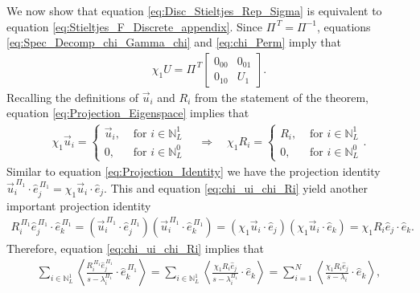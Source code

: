 \documentclass{cmslatex}
\begin{document}
We now show that equation \eqref{eq:Disc_Stieltjes_Rep_Sigma} is
equivalent to equation \eqref{eq:Stieltjes_F_Discrete_appendix}. Since
$\Pi^{\,T}=\Pi^{-1}$, equations \eqref{eq:Spec_Decomp_chi_Gamma_chi} and 
\eqref{eq:chi_Perm} imply that
%
\begin{align}\label{eq:Projection_Eigenspace}
  \chi_1U=\Pi^{\,T}\left[
  \begin{array}{ccc}
    0_{00}&0_{01}\\
    0_{10}&U_1  
    \end{array}
\right].
\end{align}
%
Recalling the definitions of $\vec{u}_i$ and $R_i$ from the
statement of the theorem, equation \eqref{eq:Projection_Eigenspace}
implies that 
%
\begin{align}\label{eq:chi_ui_chi_Ri}
  \chi_1\vec{u}_i=
  \begin{cases}
  \vec{u}_i, &\text{ for } i\in\mathbb{N}_L^1  \\
  0,        &\text{ for } i\in\mathbb{N}_L^0
  \end{cases}
  \quad \Rightarrow \quad
   \chi_1R_i=
  \begin{cases}
  R_i, &\text{ for } i\in\mathbb{N}_L^1  \\
  0,  &\text{ for } i\in\mathbb{N}_L^0
  \end{cases}.
\end{align}
%
Similar to equation \eqref{eq:Projection_Identity} we have the
projection identity
$\vec{u}_i^{\,\Pi_1}\cdot\hat{e}_j^{\,\Pi_1}=\chi_1\vec{u}_i\cdot\hat{e}_j$. This and
equation \eqref{eq:chi_ui_chi_Ri} yield another important projection
identity 
%
\begin{align*}
  R_i^{\,\Pi_1}\hat{e}_j^{\,\Pi_1}\cdot\hat{e}_k^{\,\Pi_1}
  =
   (\vec{u}_i^{\,\Pi_1}\cdot\hat{e}_j^{\,\Pi_1})(\vec{u}_i^{\,\Pi_1}\cdot\hat{e}_k^{\,\Pi_1}) 
  =(\chi_1\vec{u}_i\cdot\hat{e}_j)(\chi_1\vec{u}_i\cdot\hat{e}_k)
  =\chi_1R_i\hat{e}_j\cdot\hat{e}_k.
\end{align*}
%
Therefore, equation \eqref{eq:chi_ui_chi_Ri} implies that
%
\begin{align*}
 \sum_{i\in\mathbb{N}_L^1}\left\langle
          \frac{R_i^{\,\Pi_1}\hat{e}_j^{\,\Pi_1}}{s-\lambda_i^{\Pi_1}}\cdot\hat{e}_k^{\,\Pi_1}
          \right\rangle 
 =
 \sum_{i\in\mathbb{N}_L^1}\left\langle
          \frac{\chi_1R_i\hat{e}_j}{s-\lambda_i^{\Pi_1}}\cdot\hat{e}_k
          \right\rangle 
          =
 \sum_{i=1}^N\left\langle
          \frac{\chi_1R_i\hat{e}_j}{s-\lambda_i}\cdot\hat{e}_k
          \right\rangle ,
\end{align*}
\end{document}
